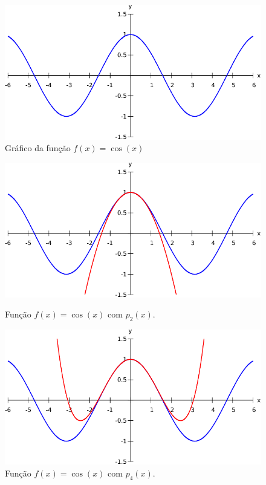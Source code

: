\documentclass[10pt]{article}
\begin{document}
\begin{figure}[H]
\centering
\includegraphics[scale=1]{fx.pdf}
\caption{Gráfico da função $f(x)=\cos(x)$}
\label{fig1}
\end{figure}

\begin{figure}[H]
\begin{minipage}[t]{0.45\textwidth}
\centering
\includegraphics[scale=0.68]{fx-px2.pdf}
\caption{Função $f(x)=\cos(x)$ com $p_2(x)$.}
\label{fig2}
\end{minipage}%
\hfill
\begin{minipage}[t]{0.45\textwidth}
\centering
\includegraphics[scale=0.68]{fx-px4.pdf}
\caption{Função $f(x)=\cos(x)$ com $p_4(x)$.}
\label{fig3}
\end{minipage}
\end{figure}
\end{document}
